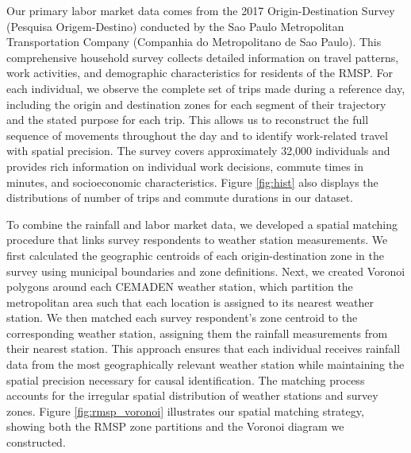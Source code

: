 Our primary labor market data comes from the 2017 Origin-Destination Survey (Pesquisa Origem-Destino) conducted by the Sao Paulo Metropolitan Transportation Company (Companhia do Metropolitano de Sao Paulo). This comprehensive household survey collects detailed information on travel patterns, work activities, and demographic characteristics for residents of the RMSP. For each individual, we observe the complete set of trips made during a reference day, including the origin and destination zones for each segment of their trajectory and the stated purpose for each trip. This allows us to reconstruct the full sequence of movements throughout the day and to identify work-related travel with spatial precision. The survey covers approximately 32,000 individuals and provides rich information on individual work decisions, commute times in minutes, and socioeconomic characteristics. Figure \ref{fig:hist} also displays the distributions of number of trips and commute durations in our dataset.

To combine the rainfall and labor market data, we developed a spatial matching procedure that links survey respondents to weather station measurements. We first calculated the geographic centroids of each origin-destination zone in the survey using municipal boundaries and zone definitions. Next, we created Voronoi polygons around each CEMADEN weather station, which partition the metropolitan area such that each location is assigned to its nearest weather station. We then matched each survey respondent's zone centroid to the corresponding weather station, assigning them the rainfall measurements from their nearest station. This approach ensures that each individual receives rainfall data from the most geographically relevant weather station while maintaining the spatial precision necessary for causal identification. The matching process accounts for the irregular spatial distribution of weather stations and survey zones. Figure \ref{fig:rmsp_voronoi} illustrates our spatial matching strategy, showing both the RMSP zone partitions and the Voronoi diagram we constructed.

